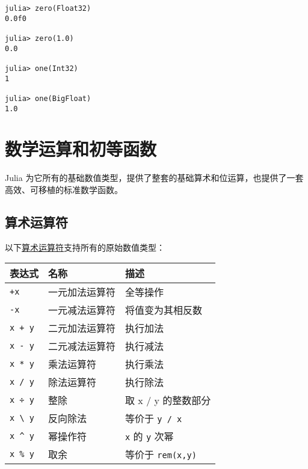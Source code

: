 \begin{verbatim}
julia> zero(Float32)
0.0f0

julia> zero(1.0)
0.0

julia> one(Int32)
1

julia> one(BigFloat)
1.0
\end{verbatim}



\hypertarget{7792257531330504645}{}


\chapter{数学运算和初等函数}



Julia 为它所有的基础数值类型，提供了整套的基础算术和位运算，也提供了一套高效、可移植的标准数学函数。



\hypertarget{11578520796345832337}{}


\section{算术运算符}



以下\href{https://en.wikipedia.org/wiki/Arithmetic\#Arithmetic\_operations}{算术运算符}支持所有的原始数值类型：




\begin{table}[h]

\begin{tabulary}{\linewidth}{|L|L|L|}
\hline
表达式 & 名称 & 描述 \\
\hline
\texttt{+x} & 一元加法运算符 & 全等操作 \\
\hline
\texttt{-x} & 一元减法运算符 & 将值变为其相反数 \\
\hline
\texttt{x + y} & 二元加法运算符 & 执行加法 \\
\hline
\texttt{x - y} & 二元减法运算符 & 执行减法 \\
\hline
\texttt{x * y} & 乘法运算符 & 执行乘法 \\
\hline
\texttt{x / y} & 除法运算符 & 执行除法 \\
\hline
\texttt{x ÷ y} & 整除 & 取 x / y 的整数部分 \\
\hline
\texttt{x {\textbackslash} y} & 反向除法 & 等价于 \texttt{y / x} \\
\hline
\texttt{x {\textasciicircum} y} & 幂操作符 & \texttt{x} 的 \texttt{y} 次幂 \\
\hline
\texttt{x \% y} & 取余 & 等价于 \texttt{rem(x,y)} \\
\hline
\end{tabulary}

\end{table}



